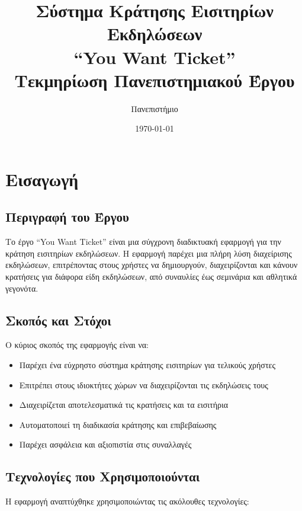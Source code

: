 \documentclass[12pt,a4paper]{report}
\title{
    \textbf{Σύστημα Κράτησης Εισιτηρίων Εκδηλώσεων}\\
    \large ``You Want Ticket''\\
    \vspace{1cm}
    \normalsize Τεκμηρίωση Πανεπιστημιακού Έργου
}
\author{Πανεπιστήμιο}
\date{\today}
\begin{document}
\hypersetup{pageanchor=false}
\maketitle
\hypersetup{pageanchor=true}

\tableofcontents
\newpage

\chapter{Εισαγωγή}

\section{Περιγραφή του Έργου}

Το έργο ``You Want Ticket'' είναι μια σύγχρονη διαδικτυακή εφαρμογή για την κράτηση εισιτηρίων εκδηλώσεων. Η εφαρμογή παρέχει μια πλήρη λύση διαχείρισης εκδηλώσεων, επιτρέποντας στους χρήστες να δημιουργούν, διαχειρίζονται και κάνουν κρατήσεις για διάφορα είδη εκδηλώσεων, από συναυλίες έως σεμινάρια και αθλητικά γεγονότα.

\section{Σκοπός και Στόχοι}

Ο κύριος σκοπός της εφαρμογής είναι να:
\begin{itemize}
    \item Παρέχει ένα εύχρηστο σύστημα κράτησης εισιτηρίων για τελικούς χρήστες
    \item Επιτρέπει στους ιδιοκτήτες χώρων να διαχειρίζονται τις εκδηλώσεις τους
    \item Διαχειρίζεται αποτελεσματικά τις κρατήσεις και τα εισιτήρια
    \item Αυτοματοποιεί τη διαδικασία κράτησης και επιβεβαίωσης
    \item Παρέχει ασφάλεια και αξιοπιστία στις συναλλαγές
\end{itemize}

\section{Τεχνολογίες που Χρησιμοποιούνται}

Η εφαρμογή αναπτύχθηκε χρησιμοποιώντας τις ακόλουθες τεχνολογίες:
\end{document}
